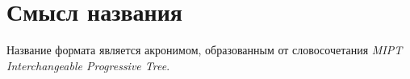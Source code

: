 \section{Смысл названия}
Название формата является акронимом, образованным от словосочетания \emph{MIPT Interchangeable Progressive Tree}.

